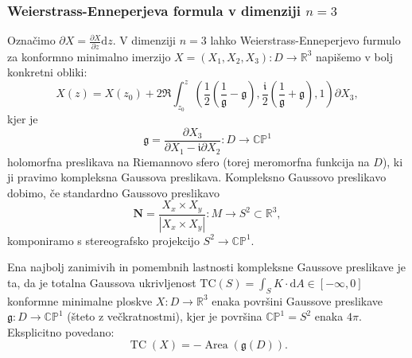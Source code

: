 \documentclass[8pt]{beamer}
\theoremstyle{definition}
\theoremstyle{remark}
\theoremstyle{plain}
\numberwithin{equation}{section}  %
\begin{document}
\begin{frame}
    \frametitle{Weierstrass-Enneperjeva formula v dimenziji $n=3$}

    Označimo $\partial X=\frac{\partial X}{\partial z} \mathrm{d} z$. V dimenziji $n=3$ lahko Weierstrass-Enneperjevo furmulo za konformno minimalno imerzijo $X=\left(X_1, X_2, X_3\right): D \rightarrow \mathbb{R}^3$ napišemo v bolj konkretni obliki:
    \begin{equation*}
        X(z)=X\left(z_0\right)+2 \Re \int_{z_0}^z\left(\frac{1}{2}\left(\frac{1}{\mathfrak{g}}-\mathfrak{g}\right), \frac{\mathfrak{i}}{2}\left(\frac{1}{\mathfrak{g}}+\mathfrak{g}\right), 1\right) \partial X_3, 
    \end{equation*}
    kjer je 
    \begin{equation*}
        \mathfrak{g}=\frac{\partial X_3}{\partial X_1-\mathfrak{i} \partial X_2}: D \longrightarrow \mathbb{C P}^1 
    \end{equation*}
    holomorfna preslikava na Riemannovo sfero (torej meromorfna funkcija na $D$), ki ji pravimo \textcolor{red1}{kompleksna Gaussova preslikava}. Kompleksno Gaussovo preslikavo dobimo, če standardno Gaussovo preslikavo 
    \begin{equation*}
        \mathbf{N}=\frac{X_x \times X_y}{\left|X_x \times X_y\right|}: M \rightarrow S^2 \subset \mathbb{R}^3,
    \end{equation*}
    komponiramo s stereografsko projekcijo $S^2 \rightarrow \mathbb{CP}^1$.
    
    \vspace{0.8em}

    Ena najbolj zanimivih in pomembnih lastnosti kompleksne Gaussove preslikave je ta, da je totalna Gaussova ukrivljenost $\mathrm{TC}(S)=\int_S K \cdot \mathrm{d} A \in[-\infty, 0]$ konformne minimalne ploskve $X: D \rightarrow \mathbb{R}^3$ enaka površini Gaussove preslikave $\mathfrak{g}: D \rightarrow \mathbb{C P}^1$ (šteto z večkratnostmi), kjer je površina $\mathbb{C P}^1=S^2$ enaka $4 \pi$. Eksplicitno povedano: 
    \begin{equation*}
        \operatorname{TC}(X)=-\operatorname{Area}(\mathfrak{g}(D)) .
    \end{equation*}
    
\end{frame}
\end{document}
